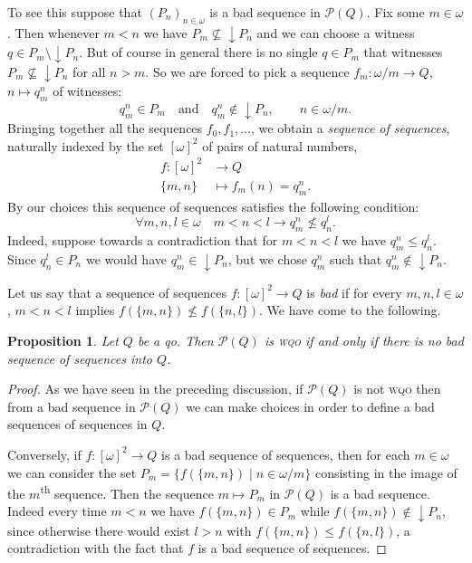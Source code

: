 \documentclass{article}%
\theoremstyle{plain}
\newtheorem{proposition}[theorem]{Proposition}
\theoremstyle{definition}
\theoremstyle{remark}
\newcommand{\ts}[1]{\textsuperscript{#1}}
\newcommand{\wqo}{\textsc{wqo}}
\DeclareMathOperator{\dcl}{\downarrow}
\begin{document}
To see this suppose that $(P_{n})_{n\in\omega}$ is a bad sequence in $\mathcal{P}(Q)$. Fix some $m\in \omega$. Then whenever $m<n$ we have $P_{m}\nsubseteq \dcl P_{n}$ and we can choose a witness $q\in P_{m}\setminus \dcl P_{n}$. But of course in general there is no single $q\in P_{m}$ that witnesses $P_{m}\nsubseteq \dcl P_{n}$ for all $n>m$. So we are forced to pick a sequence $f_{m}:\omega/m\to Q$, $n\mapsto q^{n}_{m}$ of witnesses:
\[
q^{n}_{m}\in P_{m} \quad \text{and}\quad q^{n}_{m}\notin \dcl P_{n}, \qquad \text{$n\in\omega/m$}.
\]
Bringing together all the sequences $f_{0},f_{1},\ldots$, we obtain a \emph{sequence of sequences}, naturally indexed by the set $[\omega]^{2}$ of pairs of natural numbers, 
\begin{align*}
f:[\omega]^{2}&\longrightarrow Q\\ 
\{m,n\}&\longmapsto f_{m}(n)=q^{n}_{m}.
\end{align*}
By our choices this sequence of sequences satisfies the following condition: 
\[
\forall m,n,l\in\omega \quad m<n<l \to q^{n}_{m}\nleq q^{l}_{n}.
\]
Indeed, suppose towards a contradiction that for $m<n<l$ we have $q_{m}^{n}\leq q_{n}^{l}$. Since $q_{n}^{l}\in P_{n}$ we would have $q_{m}^{n}\in \dcl P_{n}$, but we chose $q_{m}^{n}$ such that $q_{m}^{n}\notin \dcl P_{n}$.

Let us say that a sequence of sequences $f:[\omega]^{2}\to Q$ is \emph{bad} if for every $m,n,l\in\omega$, $m<n<l$ implies $f(\{m,n\})\nleq f(\{n,l\})$. We have come to the following.

\begin{proposition}\label{prop2BQOssiDownQwqo}
Let $Q$ be a qo. Then $\mathcal{P}(Q)$ is \wqo{} if and only if there is no bad sequence of sequences into $Q$.
\end{proposition}
\begin{proof}
As we have seen in the preceding discussion, if $\mathcal{P}(Q)$ is not \wqo{} then from a bad sequence in $\mathcal{P}(Q)$ we can make choices in order to define a bad sequences of sequences in $Q$.

Conversely, if $f:[\omega]^{2}\to Q$ is a bad sequence of sequences, then for each $m\in\omega$ we can consider the set $P_{m}=\{f(\{m,n\})\mid n\in\omega/m\}$ consisting in the image of the $m$\ts{th} sequence. Then the sequence $m\mapsto P_{m}$ in $\mathcal{P}(Q)$ is a bad sequence. Indeed every time $m<n$ we have $f(\{m,n\})\in P_{m}$ while $f(\{m,n\})\notin \dcl P_{n}$, since otherwise there would exist $l>n$ with $f(\{m,n\})\leq f(\{n,l\})$, a contradiction with the fact that $f$ is a bad sequence of sequences. 
\end{proof}
\end{document}
